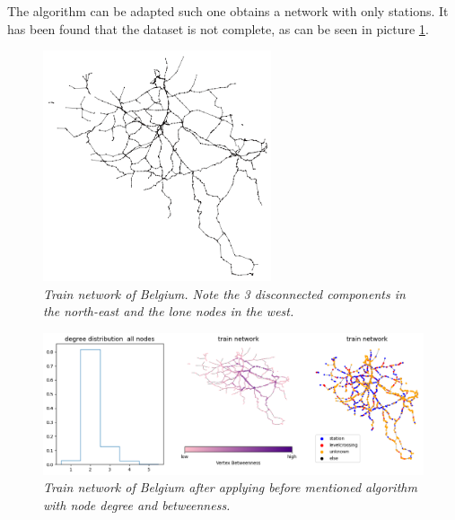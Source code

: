 The algorithm can be adapted such one obtains a network with only stations. 
It has been found that the dataset is not complete, as can be seen in picture \ref{rail2}.




\begin{figure}[H]
\begin{center}
	\includegraphics[width=0.6\textwidth]{rail1.png}
	\caption{\emph{ Train network of Belgium. Note the 3 disconnected components in the north-east and the lone nodes in the west. }}
	\label{rail2}
\end{center}
\end{figure}

\begin{figure}[H]
\begin{center}
	\includegraphics[width=1\textwidth]{rails4.png}
	\caption{\emph{ Train network of Belgium after applying before mentioned algorithm with node degree and betweenness. }}
	\label{rail}
\end{center}
\end{figure}
\newpage